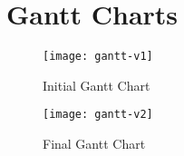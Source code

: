 \chapter{Gantt Charts}
\label{appendix:gantt}

\begin{figure}[!h]
    \centering
    \texttt{[image: gantt-v1]}
    \caption{Initial Gantt Chart}\label{fig:gantt-v1}
\end{figure}

\begin{figure}[!h]
    \centering
    \texttt{[image: gantt-v2]}
    \caption{Final Gantt Chart}\label{fig:gantt-v2}
\end{figure}